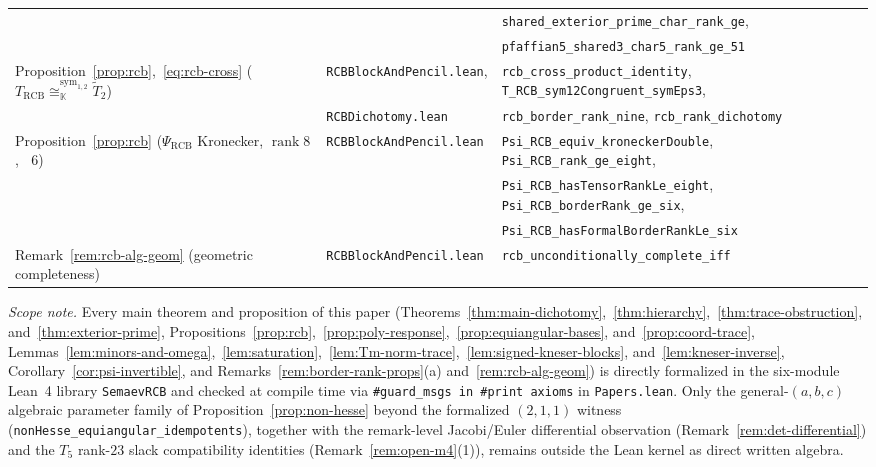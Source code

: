 \documentclass[11pt,reqno]{amsart}
\theoremstyle{definition}
\theoremstyle{remark}
\numberwithin{equation}{section}
\newcommand{\KK}{\mathbb{K}}
\DeclareMathOperator{\rk}{rank}
\DeclareMathOperator{\brk}{\underline{rank}}
\begin{document}
\begin{table}[htbp]
{\begin{tabular}{@{}lll@{}}
 & & \texttt{shared\_exterior\_prime\_char\_rank\_ge}, \\
 & & \texttt{pfaffian5\_shared3\_char5\_rank\_ge\_51} \\
Proposition~\ref{prop:rcb},~\eqref{eq:rcb-cross} ($T_{\mathrm{RCB}} \cong_{\KK}^{\mathrm{sym}_{1,2}} \widetilde{T}_2$) & \texttt{RCBBlockAndPencil.lean}, & \texttt{rcb\_cross\_product\_identity}, \texttt{T\_RCB\_sym12Congruent\_symEps3}, \\
 & \texttt{RCBDichotomy.lean} & \texttt{rcb\_border\_rank\_nine}, \texttt{rcb\_rank\_dichotomy} \\
Proposition~\ref{prop:rcb} ($\Psi_{\mathrm{RCB}}$ Kronecker, $\rk 8$, $\brk 6$) & \texttt{RCBBlockAndPencil.lean} & \texttt{Psi\_RCB\_equiv\_kroneckerDouble}, \texttt{Psi\_RCB\_rank\_ge\_eight}, \\
 & & \texttt{Psi\_RCB\_hasTensorRankLe\_eight}, \texttt{Psi\_RCB\_borderRank\_ge\_six}, \\
 & & \texttt{Psi\_RCB\_hasFormalBorderRankLe\_six} \\
Remark~\ref{rem:rcb-alg-geom} (geometric completeness) & \texttt{RCBBlockAndPencil.lean} & \texttt{rcb\_unconditionally\_complete\_iff} \\
\bottomrule
\end{tabular}%
}
\end{table}

\noindent\emph{Scope note.} Every main theorem and proposition of this paper (Theorems~\ref{thm:main-dichotomy},~\ref{thm:hierarchy},~\ref{thm:trace-obstruction}, and~\ref{thm:exterior-prime}, Propositions~\ref{prop:rcb},~\ref{prop:poly-response},~\ref{prop:equiangular-bases}, and~\ref{prop:coord-trace}, Lemmas~\ref{lem:minors-and-omega},~\ref{lem:saturation},~\ref{lem:Tm-norm-trace},~\ref{lem:signed-kneser-blocks}, and~\ref{lem:kneser-inverse}, Corollary~\ref{cor:psi-invertible}, and Remarks~\ref{rem:border-rank-props}(a) and~\ref{rem:rcb-alg-geom}) is directly formalized in the six-module Lean~4 library \texttt{SemaevRCB} and checked at compile time via \texttt{\#guard\_msgs in \#print axioms} in \texttt{Papers.lean}. Only the general-$(a, b, c)$ algebraic parameter family of Proposition~\ref{prop:non-hesse} beyond the formalized $(2, 1, 1)$ witness (\texttt{nonHesse\_equiangular\_idempotents}), together with the remark-level Jacobi/Euler differential observation (Remark~\ref{rem:det-differential}) and the $T_5$ rank-$23$ slack compatibility identities (Remark~\ref{rem:open-m4}(1)), remains outside the Lean kernel as direct written algebra.
\end{document}
